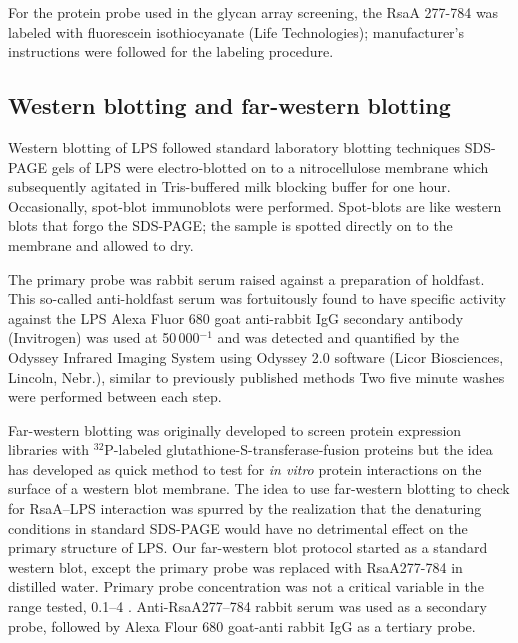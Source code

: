     For the protein probe used in the glycan array screening, the RsaA \del{}277-784 was labeled with fluorescein isothiocyanate (Life Technologies); manufacturer's instructions were followed for the labeling procedure.

        \subsection{Western blotting and far-western blotting} \label{sec:western-blotting-far}

    Western blotting of \ac{LPS} followed standard laboratory blotting techniques \ac{SDS-PAGE} gels of \ac{LPS} were electro-blotted on to a nitrocellulose membrane which subsequently agitated in Tris-buffered milk blocking buffer for one hour. Occasionally, spot-blot immunoblots were performed. Spot-blots are like western blots that forgo the \ac{SDS-PAGE}; the sample is spotted directly on to the membrane and allowed to dry.

 The primary probe was rabbit serum raised against a preparation of \caulobacter{} holdfast. This so-called anti-holdfast serum was fortuitously found to have specific activity against the \caulobacter{} \ac{LPS} Alexa Fluor 680 goat anti-rabbit IgG secondary antibody (Invitrogen) was used at 50\,000$^{-1}$ and was detected and quantified by the Odyssey Infrared Imaging System using Odyssey 2.0 software (Licor Biosciences, Lincoln, Nebr.), similar to previously published methods Two five minute washes were performed between each step.

Far-western blotting was originally developed to screen protein expression libraries with $^{32}$P-labeled glutathione-S-transferase-fusion proteins but the idea has developed as quick method to test for \textit{in vitro} protein interactions on the surface of a western blot membrane. The idea to use far-western blotting to check for RsaA--\ac{LPS} interaction was spurred by the realization that the denaturing conditions in standard \ac{SDS-PAGE} would have no detrimental effect on the primary structure of \ac{LPS}. Our far-western blot protocol started as a standard western blot, except the primary probe was replaced with RsaA\del{}277-784 in distilled water. Primary probe concentration was not a critical variable in the range tested, 0.1--4 \mgperml{}. Anti-RsaA\del{}277--784 rabbit serum was used as a secondary probe, followed by Alexa Flour 680 goat-anti rabbit IgG as a tertiary probe. 

